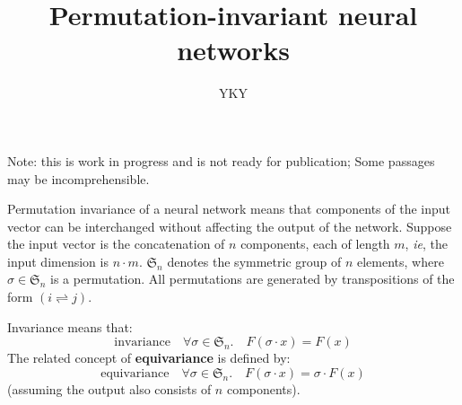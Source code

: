 

\usepackage[backend=biber,bibstyle=authoryear,citestyle=../authoryearbrack]{biblatex}


\usepackage{xeCJK}
\usepackage{color}
\usepackage{mathtools}
\usepackage{hyperref}

\title{Permutation-invariant neural networks}
\author{YKY}


\maketitle

{\color{red} Note: this is work in progress and is not ready for publication;  Some passages may be incomprehensible.}

Permutation invariance of a neural network means that components of the input vector can be interchanged without affecting the output of the network.  Suppose the input vector is the concatenation of $n$ components, each of length $m$, \textit{ie}, the input dimension is $n \cdot m$.  $\mathfrak{S}_n$ denotes the symmetric group of $n$ elements, where $\sigma \in \mathfrak{S}_n$ is a permutation.  All permutations are generated by transpositions of the form $(i \rightleftharpoons j)$.

Invariance means that:
\begin{equation}
\label{eqn:invariance}
\boxed{\mbox{invariance}} \quad \forall \sigma \in \mathfrak{S}_n. \quad F(\sigma \cdot x) = F(x)
\end{equation}
The related concept of \textbf{equivariance} is defined by:
\begin{equation}
\label{eqn:invariance}
\boxed{\mbox{equivariance}} \quad \forall \sigma \in \mathfrak{S}_n. \quad F(\sigma \cdot x) = \sigma \cdot F(x)
\end{equation}
(assuming the output also consists of $n$ components).

